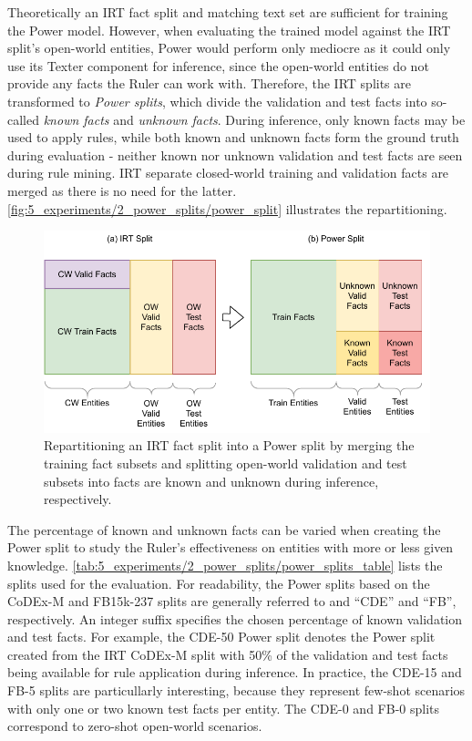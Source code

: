 Theoretically an IRT fact split and matching text set are sufficient for training the Power model. However, when evaluating the trained model against the IRT split's open-world entities, Power would perform only mediocre as it could only use its Texter component for inference, since the open-world entities do not provide any facts the Ruler can work with. Therefore, the IRT splits are transformed to \emph{Power splits}, which divide the validation and test facts into so-called \emph{known facts} and \emph{unknown facts}. During inference, only known facts may be used to apply rules, while both known and unknown facts form the ground truth during evaluation - neither known nor unknown validation and test facts are seen during rule mining. IRT separate closed-world training and validation facts are merged as there is no need for the latter. \autoref{fig:5_experiments/2_power_splits/power_split} illustrates the repartitioning.

\begin{figure}[t]
    \centering
    \includegraphics[width=\textwidth]{5_experiments/2_power_splits/power_split}
    \caption{Repartitioning an IRT fact split into a Power split by merging the training fact subsets and splitting open-world validation and test subsets into facts are known and unknown during inference, respectively.}
    \label{fig:5_experiments/2_power_splits/power_split}
\end{figure}

The percentage of known and unknown facts can be varied when creating the Power split to study the Ruler's effectiveness on entities with more or less given knowledge. \autoref{tab:5_experiments/2_power_splits/power_splits_table} lists the splits used for the evaluation. For readability, the Power splits based on the CoDEx-M and FB15k-237 splits are generally referred to and ``CDE'' and ``FB'', respectively. An integer suffix specifies the chosen percentage of known validation and test facts. For example, the CDE-50 Power split denotes the Power split created from the IRT CoDEx-M split with 50\% of the validation and test facts being available for rule application during inference. In practice, the CDE-15 and FB-5 splits are particullarly interesting, because they represent few-shot scenarios with only one or two known test facts per entity. The CDE-0 and FB-0 splits correspond to zero-shot open-world scenarios.

